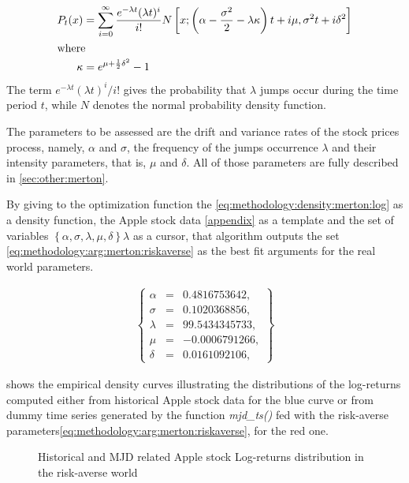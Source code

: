 \documentclass[12pt]{report}
\begin{document}
\begin{align}
  P_t(x) &= \sum_{i=0}^{\infty} 
    \frac{e^{-\lambda t} (\lambda t)^ i}{i!}
    N\left[ 
      x;
      \left( \alpha - \frac{\sigma^2}{2} - \lambda \kappa \right) t + i \mu,
      \sigma^2 t + i\delta^2
    \right]\label{eq:methodology:density:merton:log} \\
\intertext{where}
  \kappa &= e^{\mu + \frac{1}{2} \delta^2} - 1 \notag 
\end{align}
The term $e^{-\lambda t} (\lambda t)^ i / i!$ gives the probability that $\lambda$ jumps occur during the time period $t$, while $N$ denotes the normal probability density function.

The parameters to be assessed are the drift and variance rates of the stock prices process, namely, $\alpha$ and $\sigma$, the frequency of the jumps occurrence $\lambda$ and their intensity parameters, that is, $\mu$ and $\delta$.
All of those parameters are fully described in \cref{sec:other:merton}.

By giving to the optimization function the \cref{eq:methodology:density:merton:log} as a density function, the Apple stock data \cref{appendix} as a template and the set of variables 
$\left\{\alpha, \sigma, \lambda, \mu,  \delta  \right\}\lambda$ 
as a cursor, that algorithm outputs the set \ref{eq:methodology:arg:merton:riskaverse} as the best fit arguments for the real world parameters.

\begin{align}
  \left \{
  \begin{array}{lcl}
    \alpha &= &0.4816753642, \\
    \sigma &= &0.1020368856, \\
    \lambda &= &99.5434345733, \\
    \mu &= &-0.0006791266, \\
    \delta &= &0.0161092106, 
  \end{array}
  \right \}  
  \label{eq:methodology:arg:merton:riskaverse}
\end{align}


 shows the empirical density curves illustrating the distributions of the log-returns computed either from historical Apple stock data for the blue curve or from dummy time series generated by the function \textit{mjd\_ts()} fed with the risk-averse parameters\ref{eq:methodology:arg:merton:riskaverse}, for the red one.


\begin{figure}[h]
  \centering
  
  \caption{Historical and MJD related Apple stock Log-returns distribution in the risk-averse world}
  \label{p:methodology:density:aapl:merton:riskaverse}
\end{figure}
\end{document}
